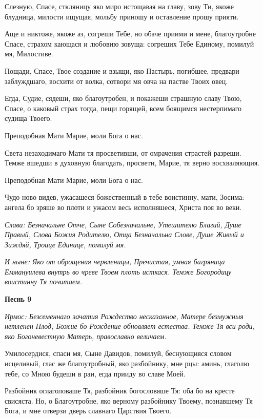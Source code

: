 Слезную, Спасе, сткляницу яко миро истощавая на главу, зову Ти, якоже блудница, милости ищущая, мольбу приношу и оставление прошу прияти. 

Аще и никтоже, якоже аз, согреши Тебе, но обаче приими и мене, благоутробне Спасе, страхом кающася и любовию зовуща: согреших Тебе Единому, помилуй мя, Милостиве. 

Пощади, Спасе, Твое создание и взыщи, яко Пастырь, погибшее, предвари заблуждшаго, восхити от волка, сотвори мя овча на пастве Твоих овец. 

Егда, Судие, сядеши, яко благоутробен, и покажеши страшную славу Твою, Спасе, о каковый страх тогда, пещи горящей, всем боящимся нестерпимаго судища Твоего. 

\bfseries 

Преподобная Мати Марие, моли Бога о нас.

\normalfont{}

Света незаходимаго Мати тя просветивши, от омрачения страстей разреши. Темже вшедши в духовную благодать, просвети, Марие, тя верно восхваляющия. 

\bfseries 

Преподобная Мати Марие, моли Бога о нас.

\normalfont{}

Чудо ново видев, ужасашеся божественный в тебе воистинну, мати, Зосима: ангела бо зряше во плоти и ужасом весь исполняшеся, Христа поя во веки. 

\itshape Слава\normalfont{}: Безначальне Отче, Сыне Собезначальне, Утешителю Благий, Душе Правый, Слова Божия Родителю, Отца Безначальна Слове, Душе Живый и Зиждяй, Троице Единице, помилуй мя. 

\itshape И ныне\normalfont{}: Яко от оброщения червленицы, Пречистая, умная багряница Еммануилева внутрь во чреве Твоем плоть исткася. Темже Богородицу воистинну Тя почитаем.


\medskip


\bfseries Песнь 9\normalfont{}

\itshape Ирмос\normalfont{}: Безсеменнаго зачатия Рождество несказанное, Матере безмужныя нетленен Плод, Божие бо Рождение обновляет естества. Темже Тя вси роди, яко Богоневестную Матерь, православно величаем. 

Умилосердися, спаси мя, Сыне Давидов, помилуй, беснующияся словом исцеливый, глас же благоутробный, яко разбойнику, мне рцы: аминь, глаголю тебе, со Мною будеши в раи, егда прииду во славе Моей. 

Разбойник оглаголоваше Тя, разбойник богословяше Тя: оба бо на кресте свисяста. Но, о Благоутробне, яко верному разбойнику Твоему, познавшему Тя Бога, и мне отверзи дверь славнаго Царствия Твоего. 

